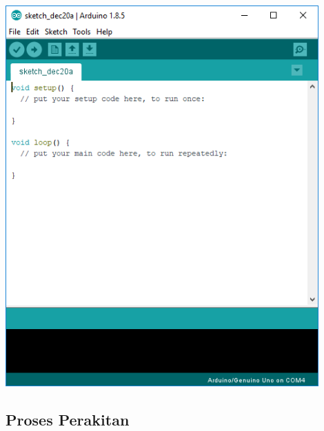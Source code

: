 \begin{enumerate}
\centerline{\includegraphics[width=0.9\textwidth]{figures/aride12.png}}
\end{enumerate}

\subsection{Proses Perakitan}

